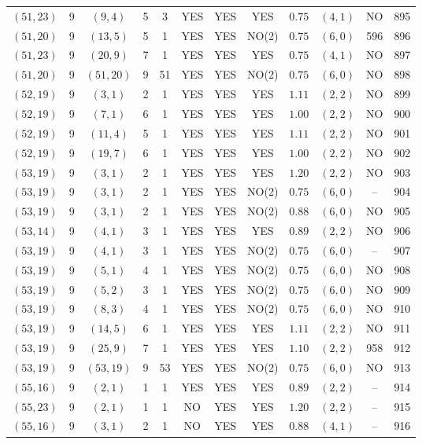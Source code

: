 \begin{longtable}{|c|c|c|c|c|c|c|c|c|c|c|c|}
$(51,23)$ & 9 & $(9,4)$ & 5 & 3 & YES & YES & YES & $0.75$ & $(4,1)$ & NO & 895\\
$(51,20)$ & 9 & $(13,5)$ & 5 & 1 & YES & YES & NO(2) & $0.75$ & $(6,0)$ & 596 & 896\\
$(51,23)$ & 9 & $(20,9)$ & 7 & 1 & YES & YES & YES & $0.75$ & $(4,1)$ & NO & 897\\
$(51,20)$ & 9 & $(51,20)$ & 9 & 51 & YES & YES & NO(2) & $0.75$ & $(6,0)$ & NO & 898\\
$(52,19)$ & 9 & $(3,1)$ & 2 & 1 & YES & YES & YES & $1.11$ & $(2,2)$ & NO & 899\\
$(52,19)$ & 9 & $(7,1)$ & 6 & 1 & YES & YES & YES & $1.00$ & $(2,2)$ & NO & 900\\
$(52,19)$ & 9 & $(11,4)$ & 5 & 1 & YES & YES & YES & $1.11$ & $(2,2)$ & NO & 901\\
$(52,19)$ & 9 & $(19,7)$ & 6 & 1 & YES & YES & YES & $1.00$ & $(2,2)$ & NO & 902\\
$(53,19)$ & 9 & $(3,1)$ & 2 & 1 & YES & YES & YES & $1.20$ & $(2,2)$ & NO & 903\\
$(53,19)$ & 9 & $(3,1)$ & 2 & 1 & YES & YES & NO(2) & $0.75$ & $(6,0)$ & -- & 904\\
$(53,19)$ & 9 & $(3,1)$ & 2 & 1 & YES & YES & NO(2) & $0.88$ & $(6,0)$ & NO & 905\\
$(53,14)$ & 9 & $(4,1)$ & 3 & 1 & YES & YES & YES & $0.89$ & $(2,2)$ & NO & 906\\
$(53,19)$ & 9 & $(4,1)$ & 3 & 1 & YES & YES & NO(2) & $0.75$ & $(6,0)$ & -- & 907\\
$(53,19)$ & 9 & $(5,1)$ & 4 & 1 & YES & YES & NO(2) & $0.75$ & $(6,0)$ & NO & 908\\
$(53,19)$ & 9 & $(5,2)$ & 3 & 1 & YES & YES & NO(2) & $0.75$ & $(6,0)$ & NO & 909\\
$(53,19)$ & 9 & $(8,3)$ & 4 & 1 & YES & YES & NO(2) & $0.75$ & $(6,0)$ & NO & 910\\
$(53,19)$ & 9 & $(14,5)$ & 6 & 1 & YES & YES & YES & $1.11$ & $(2,2)$ & NO & 911\\
$(53,19)$ & 9 & $(25,9)$ & 7 & 1 & YES & YES & YES & $1.10$ & $(2,2)$ & 958 & 912\\
$(53,19)$ & 9 & $(53,19)$ & 9 & 53 & YES & YES & NO(2) & $0.75$ & $(6,0)$ & NO & 913\\
$(55,16)$ & 9 & $(2,1)$ & 1 & 1 & YES & YES & YES & $0.89$ & $(2,2)$ & -- & 914\\
$(55,23)$ & 9 & $(2,1)$ & 1 & 1 & NO & YES & YES & $1.20$ & $(2,2)$ & -- & 915\\
$(55,16)$ & 9 & $(3,1)$ & 2 & 1 & NO & YES & YES & $0.88$ & $(4,1)$ & -- & 916\\

\end{longtable}
